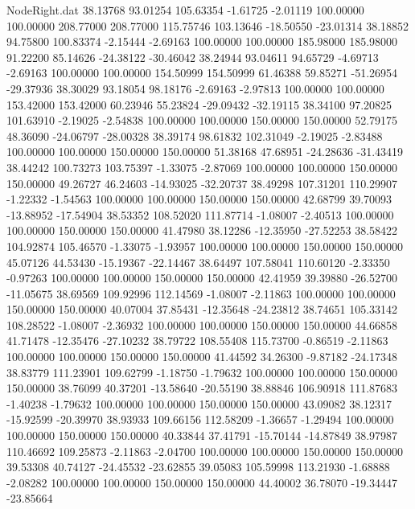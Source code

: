 \begin{filecontents}{NodeRight.dat}
  38.13768   93.01254  105.63354    -1.61725   -2.01119  100.00000  100.00000  208.77000  208.77000  115.75746  103.13646  -18.50550  -23.01314
  38.18852   94.75800  100.83374    -2.15444   -2.69163  100.00000  100.00000  185.98000  185.98000   91.22200   85.14626  -24.38122  -30.46042
  38.24944   93.04611   94.65729    -4.69713   -2.69163  100.00000  100.00000  154.50999  154.50999   61.46388   59.85271  -51.26954  -29.37936
  38.30029   93.18054   98.18176    -2.69163   -2.97813  100.00000  100.00000  153.42000  153.42000   60.23946   55.23824  -29.09432  -32.19115
  38.34100   97.20825  101.63910    -2.19025   -2.54838  100.00000  100.00000  150.00000  150.00000   52.79175   48.36090  -24.06797  -28.00328
  38.39174   98.61832  102.31049    -2.19025   -2.83488  100.00000  100.00000  150.00000  150.00000   51.38168   47.68951  -24.28636  -31.43419
  38.44242  100.73273  103.75397    -1.33075   -2.87069  100.00000  100.00000  150.00000  150.00000   49.26727   46.24603  -14.93025  -32.20737
  38.49298  107.31201  110.29907    -1.22332   -1.54563  100.00000  100.00000  150.00000  150.00000   42.68799   39.70093  -13.88952  -17.54904
  38.53352  108.52020  111.87714    -1.08007   -2.40513  100.00000  100.00000  150.00000  150.00000   41.47980   38.12286  -12.35950  -27.52253
  38.58422  104.92874  105.46570    -1.33075   -1.93957  100.00000  100.00000  150.00000  150.00000   45.07126   44.53430  -15.19367  -22.14467
  38.64497  107.58041  110.60120    -2.33350   -0.97263  100.00000  100.00000  150.00000  150.00000   42.41959   39.39880  -26.52700  -11.05675
  38.69569  109.92996  112.14569    -1.08007   -2.11863  100.00000  100.00000  150.00000  150.00000   40.07004   37.85431  -12.35648  -24.23812
  38.74651  105.33142  108.28522    -1.08007   -2.36932  100.00000  100.00000  150.00000  150.00000   44.66858   41.71478  -12.35476  -27.10232
  38.79722  108.55408  115.73700    -0.86519   -2.11863  100.00000  100.00000  150.00000  150.00000   41.44592   34.26300   -9.87182  -24.17348
  38.83779  111.23901  109.62799    -1.18750   -1.79632  100.00000  100.00000  150.00000  150.00000   38.76099   40.37201  -13.58640  -20.55190
  38.88846  106.90918  111.87683    -1.40238   -1.79632  100.00000  100.00000  150.00000  150.00000   43.09082   38.12317  -15.92599  -20.39970
  38.93933  109.66156  112.58209    -1.36657   -1.29494  100.00000  100.00000  150.00000  150.00000   40.33844   37.41791  -15.70144  -14.87849
  38.97987  110.46692  109.25873    -2.11863   -2.04700  100.00000  100.00000  150.00000  150.00000   39.53308   40.74127  -24.45532  -23.62855
  39.05083  105.59998  113.21930    -1.68888   -2.08282  100.00000  100.00000  150.00000  150.00000   44.40002   36.78070  -19.34447  -23.85664

\end{filecontents}
